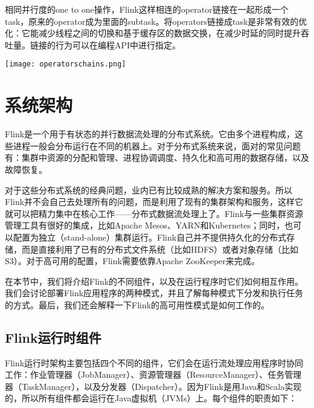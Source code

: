 \documentclass[oneside]{ctexbook}
\begin{document}
相同并行度的one to one操作，Flink这样相连的operator链接在一起形成一个task，原来的operator成为里面的subtask。将operators链接成task是非常有效的优化：它能减少线程之间的切换和基于缓存区的数据交换，在减少时延的同时提升吞吐量。链接的行为可以在编程API中进行指定。

\noindent \texttt{[image: operatorschains.png]}

\section{系统架构}

Flink是一个用于有状态的并行数据流处理的分布式系统。它由多个进程构成，这些进程一般会分布运行在不同的机器上。对于分布式系统来说，面对的常见问题有：集群中资源的分配和管理、进程协调调度、持久化和高可用的数据存储，以及故障恢复。

对于这些分布式系统的经典问题，业内已有比较成熟的解决方案和服务。所以Flink并不会自己去处理所有的问题，而是利用了现有的集群架构和服务，这样它就可以把精力集中在核心工作——分布式数据流处理上了。Flink与一些集群资源管理工具有很好的集成，比如Apache Mesos、YARN和Kubernetes；同时，也可以配置为独立（stand-alone）集群运行。Flink自己并不提供持久化的分布式存储，而是直接利用了已有的分布式文件系统（比如HDFS）或者对象存储（比如S3）。对于高可用的配置，Flink需要依靠Apache ZooKeeper来完成。

在本节中，我们将介绍Flink的不同组件，以及在运行程序时它们如何相互作用。我们会讨论部署Flink应用程序的两种模式，并且了解每种模式下分发和执行任务的方式。最后，我们还会解释一下Flink的高可用性模式是如何工作的。

\subsection{Flink运行时组件}

Flink运行时架构主要包括四个不同的组件，它们会在运行流处理应用程序时协同工作：作业管理器（JobManager）、资源管理器（ResourceManager）、任务管理器（TaskManager），以及分发器（Dispatcher）。因为Flink是用Java和Scala实现的，所以所有组件都会运行在Java虚拟机（JVMs）上。每个组件的职责如下：
\end{document}
